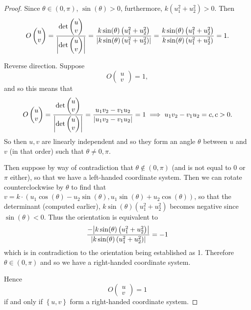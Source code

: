 \documentclass[11pt]{article}
\newcommand{\br}[1]{\left(#1\right)}
\newcommand{\cbr}[1]{\left\{#1\right\}}
\begin{document}
\begin{proof}
    Since $\theta\in\br{0,\pi}$, $\sin(\theta)> 0$, furthermore, $k\br{u_1^2+u_2^2} > 0$. Then $$O\begin{pmatrix}
        u \\ v
    \end{pmatrix} = \frac{\det\begin{pmatrix}
        u \\ v
    \end{pmatrix}}{\abs{\det\begin{pmatrix}
        u \\ v
    \end{pmatrix}}} = \frac{k\sin(\theta)\br{u_1^2+u_2^2}}{\abs{k\sin(\theta)\br{u_1^2+u_2^2}}} = \frac{k\sin(\theta)\br{u_1^2+u_2^2}}{k\sin(\theta)\br{u_1^2+u_2^2}} = 1.$$

    Reverse direction. Suppose $$O\begin{pmatrix}
        u \\ v
    \end{pmatrix} = 1,$$ and so this means that $$O\begin{pmatrix}
        u \\ v
    \end{pmatrix} = \frac{\det\begin{pmatrix}
        u \\ v
    \end{pmatrix}}{\abs{\det\begin{pmatrix}
        u \\ v
    \end{pmatrix}}} = \frac{u_1v_2-v_1u_2}{\abs{u_1v_2-v_1u_2}} = 1\implies u_1v_2-v_1u_2 = c, c> 0.$$ So then $u,v$ are linearly independent and so they form an angle $\theta$ between $u$ and $v$ (in that order) such that $\theta \neq 0,\pi$.

    Then suppose by way of contradiction that $\theta \notin (0,\pi)$ (and is not equal to $0$ or $\pi$ either), so that we have a left-handed coordinate system. Then we can rotate counterclockwise by $\theta$ to find that $v = k\cdot (u_1\cos(\theta) - u_2\sin(\theta), u_1\sin(\theta) + u_2\cos(\theta))$, so that the determinant (computed earlier), $k\sin(\theta)\br{u_1^2+u_2^2}$ becomes negative since $\sin(\theta) < 0$. Thus the orientation is equivalent to $$\frac{-\abs{k\sin(\theta)\br{u_1^2+u_2^2}}}{\abs{k\sin(\theta)\br{u_1^2+u_2^2}}} = -1$$ which is in contradiction to the orientation being established as 1. Therefore $\theta\in(0,\pi)$ and so we have a right-handed coordinate system.

    Hence $$O\begin{pmatrix}
        u \\ v
    \end{pmatrix} = 1$$ if and only if $\cbr{u,v}$ form a right-handed coordinate system.
\end{proof}
\end{document}
